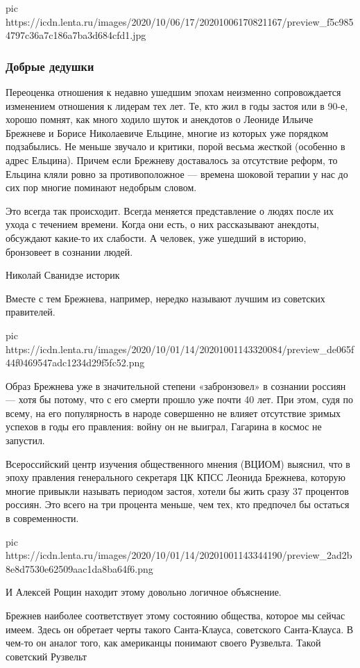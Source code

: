 \ifcmt
pic https://icdn.lenta.ru/images/2020/10/06/17/20201006170821167/preview_f5c9854797c36a7c186a7ba3d684cfd1.jpg
\fi

\subsubsection{Добрые дедушки}

Переоценка отношения к недавно ушедшим эпохам неизменно сопровождается
изменением отношения к лидерам тех лет. Те, кто жил в годы застоя или в 90-е,
хорошо помнят, как много ходило шуток и анекдотов о Леониде Ильиче Брежневе и
Борисе Николаевиче Ельцине, многие из которых уже порядком подзабылись. Не
меньше звучало и критики, порой весьма жесткой (особенно в адрес Ельцина).
Причем если Брежневу доставалось за отсутствие реформ, то Ельцина кляли ровно
за противоположное — времена шоковой терапии у нас до сих пор многие поминают
недобрым словом.

Это всегда так происходит. Всегда меняется представление о людях после их ухода
с течением времени. Когда они есть, о них рассказывают анекдоты, обсуждают
какие-то их слабости. А человек, уже ушедший в историю, бронзовеет в сознании
людей.

Николай Сванидзе историк

Вместе с тем Брежнева, например, нередко называют лучшим из советских
правителей.

\ifcmt
pic https://icdn.lenta.ru/images/2020/10/01/14/20201001143320084/preview_de065f44f0469547adc1234d29f5fc52.png
\fi

Образ Брежнева уже в значительной степени «забронзовел» в сознании россиян —
хотя бы потому, что с его смерти прошло уже почти 40 лет. При этом, судя по
всему, на его популярность в народе совершенно не влияет отсутствие зримых
успехов в годы его правления: войну он не выиграл, Гагарина в космос не
запустил.

Всероссийский центр изучения общественного мнения (ВЦИОМ) выяснил, что в эпоху
правления генерального секретаря ЦК КПСС Леонида Брежнева, которую многие
привыкли называть периодом застоя, хотели бы жить сразу 37 процентов россиян.
Это всего на три процента меньше, чем тех, кто предпочел бы остаться в
современности.

\ifcmt
pic https://icdn.lenta.ru/images/2020/10/01/14/20201001143344190/preview_2ad2b8e8d7530e62509aac1da8ba64f6.png
\fi

И Алексей Рощин находит этому довольно логичное объяснение.

Брежнев наиболее соответствует этому состоянию общества, которое мы сейчас
имеем. Здесь он обретает черты такого Санта-Клауса, советского Санта-Клауса. В
чем-то он аналог того, как американцы понимают своего Рузвельта. Такой
советский Рузвельт

